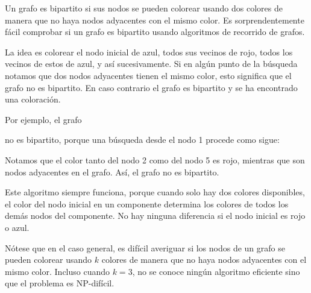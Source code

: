 
Un grafo es bipartito si sus nodos se pueden colorear
usando dos colores de manera que no haya nodos
adyacentes con el mismo color.
Es sorprendentemente fácil comprobar si un grafo
es bipartito usando algoritmos de recorrido de grafos.

La idea es colorear el nodo inicial de azul,
todos sus vecinos de rojo, todos los vecinos de estos de azul, y así sucesivamente.
Si en algún punto de la búsqueda notamos que
dos nodos adyacentes tienen el mismo color,
esto significa que el grafo no es bipartito.
En caso contrario el grafo es bipartito y se ha encontrado
una coloración.

Por ejemplo, el grafo
\begin{center}
\end{center}
no es bipartito, porque una búsqueda desde el nodo 1
procede como sigue:
\begin{center}
\end{center}
Notamos que el color tanto del nodo 2 como del nodo 5
es rojo, mientras que son nodos adyacentes en el grafo.
Así, el grafo no es bipartito.

Este algoritmo siempre funciona, porque cuando
solo hay dos colores disponibles,
el color del nodo inicial en un componente
determina los colores de todos los demás nodos del componente.
No hay ninguna diferencia si el
nodo inicial es rojo o azul.

Nótese que en el caso general,
es difícil averiguar si los nodos
de un grafo se pueden colorear usando $k$ colores
de manera que no haya nodos adyacentes con el mismo color.
Incluso cuando $k=3$, no se conoce ningún algoritmo eficiente
sino que el problema es NP-difícil.
